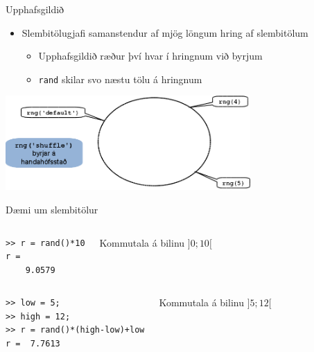 \documentclass{beamer}
\begin{document}
\begin{frame}[shrink]{Upphafsgildið}
\vspace{1cm}
\begin{itemize}
 \item Slembitölugjafi samanstendur af mjög löngum hring af slembitölum
 \begin{itemize}
  \item Upphafsgildið ræður því hvar í hringnum við byrjum
  \item \texttt{rand} skilar svo næstu tölu á hringnum
 \end{itemize}
\end{itemize}
\begin{center}
\includegraphics[width=0.7\textwidth]{Pics/random-circle}
\end{center}
\end{frame}

\begin{frame}[fragile]{Dæmi um slembitölur}
\vspace{-0.5cm}
\begin{columns}
\begin{verbatim}
>> r = rand()*10
r =
    9.0579
\end{verbatim}
Kommutala á bilinu $]0;10[$
\end{columns}

\begin{columns}
\begin{verbatim}
>> low = 5;
>> high = 12;
>> r = rand()*(high-low)+low
r =  7.7613
\end{verbatim}
Kommutala á bilinu $]5;12[$
\end{columns}
\end{frame}
\end{document}
